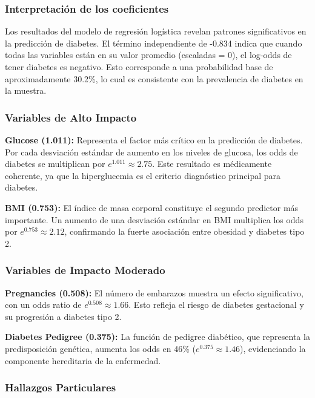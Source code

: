 \documentclass[12pt,a4paper]{article}
\begin{document}
\subsubsection{Interpretación de los coeficientes}

Los resultados del modelo de regresión logística revelan patrones significativos en la predicción de diabetes. El término independiente de -0.834 indica que cuando todas las variables están en su valor promedio (escaladas = 0), el log-odds de tener diabetes es negativo. Esto corresponde a una probabilidad base de aproximadamente 30.2\%, lo cual es consistente con la prevalencia de diabetes en la muestra.

\subsubsection{Variables de Alto Impacto}

\textbf{Glucose (1.011):} Representa el factor más crítico en la predicción de diabetes. Por cada desviación estándar de aumento en los niveles de glucosa, los odds de diabetes se multiplican por $e^{1.011} \approx 2.75$. Este resultado es médicamente coherente, ya que la hiperglucemia es el criterio diagnóstico principal para diabetes.

\textbf{BMI (0.753):} El índice de masa corporal constituye el segundo predictor más importante. Un aumento de una desviación estándar en BMI multiplica los odds por $e^{0.753} \approx 2.12$, confirmando la fuerte asociación entre obesidad y diabetes tipo 2.

\subsubsection{Variables de Impacto Moderado}

\textbf{Pregnancies (0.508):} El número de embarazos muestra un efecto significativo, con un odds ratio de $e^{0.508} \approx 1.66$. Esto refleja el riesgo de diabetes gestacional y su progresión a diabetes tipo 2.

\textbf{Diabetes Pedigree (0.375):} La función de pedigree diabético, que representa la predisposición genética, aumenta los odds en 46\% ($e^{0.375} \approx 1.46$), evidenciando la componente hereditaria de la enfermedad.

\subsubsection{Hallazgos Particulares}
\end{document}
